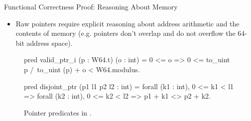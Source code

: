 \begin{frame}[fragile]
  {Functional Correctness Proof: Reasoning About Memory}
  \begin{itemize}
    \item Raw pointers require explicit reasoning about address arithmetic
      and the contents of memory (e.g. pointers don't overlap and do not overflow the 64-bit address space).
  \end{itemize}
  \vspace{2mm}
    \begin{figure}[t!]
    \centering
    \begin{minipage}{.6\textwidth}
      \begin{easycrypt}[basicstyle=\fontsize{7}{8}\selectfont\ttfamily]{}{}
pred valid_ptr_i (p : W64.t) (o : int) = 
  0 <= o => 
    0 <= to_uint p /\ to_uint (p) + o < W64.modulus.

pred disjoint_ptr (p1 l1 p2 l2 : int) =
  forall (k1 : int), 0 <= k1 < l1 =>
    forall (k2 : int), 0 <= k2 < l2 =>
      p1 + k1 <> p2 + k2.\end{easycrypt}
    \end{minipage}
    \caption{Pointer predicates in \EasyCrypt.}
  \end{figure}
\end{frame}

